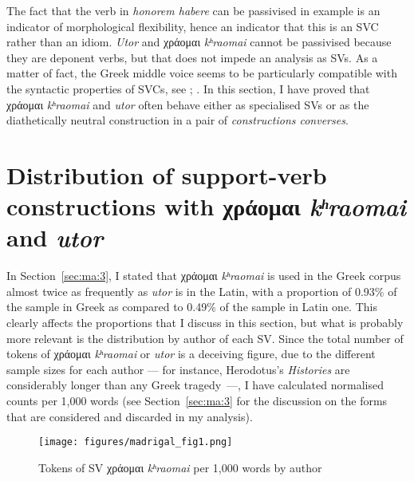 \documentclass[output=paper,colorlinks,citecolor=brown]{langscibook}
\begin{document}
\z

\z

The fact that the verb in \emph{honorem habere} can be passivised in example
 is an indicator of morphological flexibility, hence an indicator that
this is an SVC rather than an idiom. \emph{Utor} and χράομαι
\emph{kʰraomai} cannot be passivised because they are deponent verbs,
but that does not impede an analysis as SVs. As a matter of fact, the Greek middle voice
seems to be particularly compatible with the syntactic properties of SVCs, see
\citet{jimenez_lopez_support_2016}; \citet{jimenez_lopez__2021}. In this section, I have
proved that χράομαι \emph{kʰraomai} and \emph{utor} often behave either as specialised SVs or as the
diathetically neutral construction in a pair of \emph{constructions converses}.

\section{Distribution of support-verb constructions with χράομαι \emph{kʰraomai} and \emph{utor}}\label{sec:ma:5}

In Section~\ref{sec:ma:3}, I stated that χράομαι \emph{kʰraomai} is used
in the Greek corpus almost twice as frequently as \emph{utor} is in the Latin, with a
proportion of 0.93\% of the sample in Greek as compared to 0.49\% of the sample in Latin one. This clearly
affects the proportions that I discuss in this section, but what is probably more relevant
is the distribution by author of each SV. Since the total number of tokens of χράομαι
\emph{kʰraomai} or \emph{utor} is a deceiving figure, due to the
different sample sizes for each author --- for instance, Herodotus's \emph{Histories} are
considerably longer than any Greek tragedy~---, I have calculated normalised counts per
1,000 words (see Section~\ref{sec:ma:3} for the discussion on the forms that are
considered and discarded in my analysis).

\begin{figure}[htb]
  \centering
  \texttt{[image: figures/madrigal\_fig1.png]}
  \caption{Tokens of SV χράομαι \emph{kʰraomai} per
    1,000 words by author}
  \label{fig:ma:1}
\end{figure}
\end{document}

